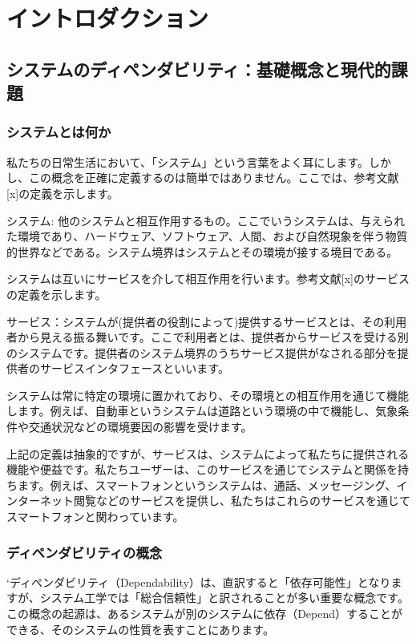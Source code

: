 \chapter{イントロダクション}
\label{chap1}

\section{システムのディペンダビリティ：基礎概念と現代的課題}

\subsection{システムとは何か}

私たちの日常生活において、「システム」という言葉をよく耳にします。しかし、この概念を正確に定義するのは簡単ではありません。ここでは、参考文献[x]の定義を示します。

システム: 他のシステムと相互作用するもの。ここでいうシステムは、与えられた環境であり、ハードウェア、ソフトウェア、人間、および自然現象を伴う物質的世界などである。システム境界はシステムとその環境が接する境目である。

システムは互いにサービスを介して相互作用を行います。参考文献[x]のサービスの定義を示します。

サービス：システムが(提供者の役割によって)提供するサービスとは、その利用者から見える振る舞いです。ここで利用者とは、提供者からサービスを受ける別のシステムです。提供者のシステム境界のうちサービス提供がなされる部分を提供者のサービスインタフェースといいます。

システムは常に特定の環境に置かれており、その環境との相互作用を通じて機能します。例えば、自動車というシステムは道路という環境の中で機能し、気象条件や交通状況などの環境要因の影響を受けます。

上記の定義は抽象的ですが、サービスは、システムによって私たちに提供される機能や便益です。私たちユーザーは、このサービスを通じてシステムと関係を持ちます。例えば、スマートフォンというシステムは、通話、メッセージング、インターネット閲覧などのサービスを提供し、私たちはこれらのサービスを通じてスマートフォンと関わっています。

\subsection{ディペンダビリティの概念}
`ディペンダビリティ（Dependability）は、直訳すると「依存可能性」となりますが、システム工学では「総合信頼性」と訳されることが多い重要な概念です。この概念の起源は、あるシステムが別のシステムに依存（Depend）することができる、そのシステムの性質を表すことにあります。

